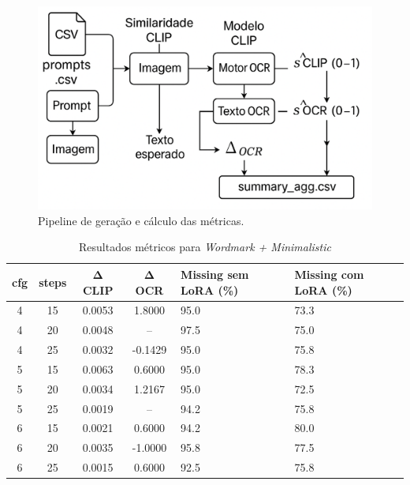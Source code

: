 \documentclass[12pt, %
openright, 
oneside, %
a4paper,    %
brazil]{facom-ufu-abntex2}
\begin{document}
\begin{figure}[ht]
  \centering
  \includegraphics[width=.9\linewidth]{pipeline_metricas_2.png}
  \caption{Pipeline de geração e cálculo das métricas.}
  \label{fig:pipeline-metricas}
\end{figure}

\begin{table}[H]
\centering
\small
\setlength{\tabcolsep}{4pt}
\begin{tabularx}{\linewidth}{|c|c|c|c|X|X|}
\hline
\textbf{cfg} & \textbf{steps} & \(\boldsymbol{\Delta}\) \textbf{CLIP} & \(\boldsymbol{\Delta}\) \textbf{OCR} & \textbf{Missing sem LoRA (\%)} & \textbf{Missing com LoRA (\%)} \\ \hline
4 & 15 & 0.0053 & 1.8000  & 95.0 & 73.3 \\ \hline
4 & 20 & 0.0048 & --      & 97.5 & 75.0 \\ \hline
4 & 25 & 0.0032 & -0.1429 & 95.0 & 75.8 \\ \hline
5 & 15 & 0.0063 & 0.6000  & 95.0 & 78.3 \\ \hline
5 & 20 & 0.0034 & 1.2167  & 95.0 & 72.5 \\ \hline
5 & 25 & 0.0019 & --      & 94.2 & 75.8 \\ \hline
6 & 15 & 0.0021 & 0.6000  & 94.2 & 80.0 \\ \hline
6 & 20 & 0.0035 & -1.0000 & 95.8 & 77.5 \\ \hline
6 & 25 & 0.0015 & 0.6000  & 92.5 & 75.8 \\ \hline
\end{tabularx}
\caption{Resultados métricos para \textit{Wordmark + Minimalistic}}
\label{tab:metrics_wm_minimalistic}
\end{table}
\end{document}
